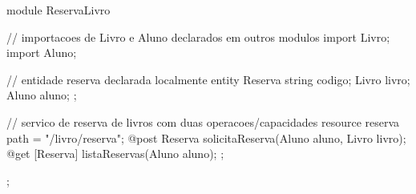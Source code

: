 module  ReservaLivro {
 // importacoes de Livro e Aluno declarados em outros modulos
 import Livro; 
 import Aluno;
 
 // entidade reserva declarada localmente
 entity Reserva {
     string codigo;
     Livro livro;
     Aluno aluno; 
 };  

 // servico de reserva de livros com duas operacoes/capacidades
 resource reserva { 
  path = "/livro/reserva";
  @post Reserva solicitaReserva(Aluno aluno, Livro livro); 
  @get [Reserva] listaReservas(Aluno aluno); 
 };
};
